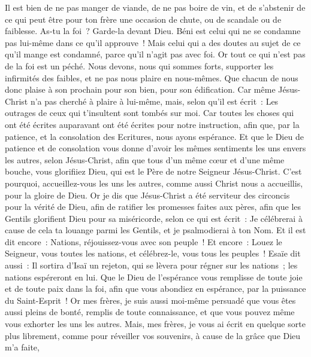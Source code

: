 \begin{multicols}{2}
Il est bien de ne pas manger de viande, de ne pas boire de vin, et de s'abstenir de ce qui peut être pour ton frère une occasion de chute, ou de scandale ou de faiblesse.
As-tu la foi~? Garde-la devant Dieu. Béni est celui qui ne se condamne pas lui-même dans ce qu'il approuve~!
Mais celui qui a des doutes au sujet de ce qu'il mange est condamné, parce qu'il n'agit pas avec foi. Or tout ce qui n'est pas de la foi est un péché.
\VerseOne{}Nous devons, nous qui sommes forts, supporter les infirmités des faibles, et ne pas nous plaire en nous-mêmes.
Que chacun de nous donc plaise à son prochain pour son bien, pour son édification.
Car même Jésus-Christ n'a pas cherché à plaire à lui-même, mais, selon qu'il est écrit~: Les outrages de ceux qui t'insultent sont tombés sur moi.
Car toutes les choses qui ont été écrites auparavant ont été écrites pour notre instruction, afin que, par la patience, et la consolation des Ecritures, nous ayons espérance.
Et que le Dieu de patience et de consolation vous donne d'avoir les mêmes sentiments les uns envers les autres, selon Jésus-Christ,
afin que tous d'un même cœur et d'une même bouche, vous glorifiiez Dieu, qui est le Père de notre Seigneur Jésus-Christ.
C'est pourquoi, accueillez-vous les uns les autres, comme aussi Christ nous a accueillis, pour la gloire de Dieu.
Or je dis que Jésus-Christ a été serviteur des circoncis pour la vérité de Dieu, afin de ratifier les promesses faites aux pères,
afin que les Gentils glorifient Dieu pour sa miséricorde, selon ce qui est écrit~: Je célébrerai à cause de cela ta louange parmi les Gentils, et je psalmodierai à ton Nom. Et il est dit encore~:
Nations, réjouissez-vous avec son peuple~!
Et encore~: Louez le Seigneur, vous toutes les nations, et célébrez-le, vous tous les peuples~! Esaïe dit aussi~:
Il sortira d'Isaï un rejeton, qui se lèvera pour régner sur les nations~; les nations espéreront en lui.
Que le Dieu de l'espérance vous remplisse de toute joie et de toute paix dans la foi, afin que vous abondiez en espérance, par la puissance du Saint-Esprit~!
 Or mes frères, je suis aussi moi-même persuadé que vous êtes aussi pleins de bonté, remplis de toute connaissance, et que vous pouvez même vous exhorter les uns les autres.
Mais, mes frères, je vous ai écrit en quelque sorte plus librement, comme pour réveiller vos souvenirs, à cause de la grâce que Dieu m'a faite,

\end{multicols}
